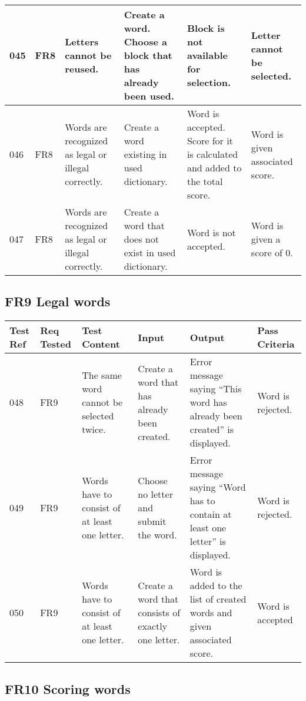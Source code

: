 \documentclass{project}
\begin{document}
\begin{longtable}{|p{0.7cm}|p{1cm}|p{3.5cm}|p{3.2cm}|p{3.5cm}|p{3.5cm}|}
045 & FR8 & Letters cannot be reused. & Create a word. Choose a block that has already been used. 
& Block is not available for selection. & Letter cannot be selected. \\ \hline

046 & FR8 & Words are recognized as legal or illegal correctly. & Create a word existing in used dictionary. 
& Word is accepted. Score for it is calculated and added to the total score. & Word is given associated score. \\ \hline

047 & FR8 & Words are recognized as legal or illegal correctly. & Create a word that does not exist in used dictionary.
& Word is not accepted. & Word is given a score of 0. \\ \hline

\end{longtable}

\subsection{FR9 Legal words}

\begin{longtable}{|p{0.7cm}|p{1cm}|p{3.5cm}|p{3.2cm}|p{3.5cm}|p{3.5cm}|}
\hline
Test Ref & Req Tested & Test Content & Input  & Output & Pass Criteria \\ \hline \hline


048 & FR9 & The same word cannot be selected twice. & Create a word that has already been created. 
& Error message saying “This word has already been created” is displayed.  & Word is rejected. \\ \hline

049 & FR9 & Words have to consist of at least one letter. & Choose no letter and submit the word.
& Error message saying “Word has to contain at least one letter” is displayed. & Word is rejected. \\ \hline

050 & FR9 & Words have to consist of at least one letter. & Create a word that consists of exactly one letter.
& Word is added to the list of created words and given associated score. & Word is accepted \\ \hline

\end{longtable}

\subsection{FR10 Scoring words}
\end{document}
